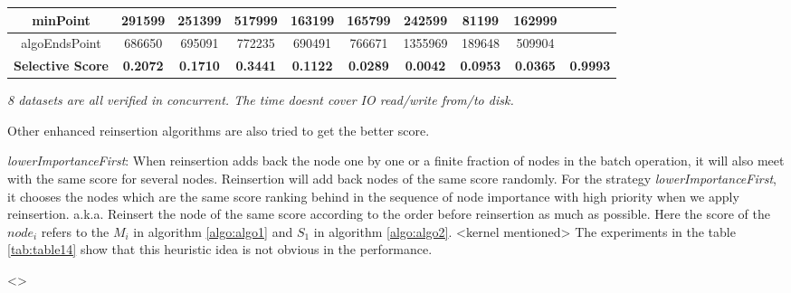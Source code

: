 \documentclass{article}
\begin{document}
\begin{table}[!htbp]
\begin{adjustwidth}{-2cm}{}
\begin{threeparttable}
\begin{tabular}{|c|c|c|c|c|c|c|c|c|c|}
				minPoint                         & 291599          & 251399          & 517999          & 163199          & 165799         & 242599         & 81199          & 162999         &                \\ \hline
				algoEndsPoint                    & 686650          & 695091          & 772235          & 690491          & 766671         & 1355969        & 189648         & 509904         &           \\ \hline \hline  
				\textbf{Selective Score}                 & \textbf{0.2072}          & \textbf{0.1710}          & \textbf{0.3441}          & \textbf{0.1122}          & \textbf{0.0289}         & \textbf{0.0042}         & \textbf{0.0953}         & \textbf{0.0365}         & \textbf{0.9993}   \\ \hline 				

			\end{tabular}
			\begin{tablenotes}
				\small
				\item\textit{ 8 datasets are all verified in concurrent. The time doesn\textquotesingle t cover IO read/write from/to disk.}
			\end{tablenotes}			
		\end{threeparttable}
	\end{adjustwidth}	
	\end{table}
	 
	 Other enhanced reinsertion algorithms are also tried to get the better score.
	 
	\begin{enumerate}
	\begin{item}
		\textit{lowerImportanceFirst}: When reinsertion adds back the node one by one or a finite fraction of nodes in the batch operation, it will also meet with the same score for several nodes. Reinsertion will add back nodes of the same score randomly. For the strategy \textit{lowerImportanceFirst}, it chooses the nodes which are the same score ranking behind in the sequence of node importance with high priority when we apply reinsertion. a.k.a. Reinsert the node of the same score according to the order before reinsertion as much as possible. Here the score of the $node_i$ refers to the $M_i$ in algorithm \ref{algo:algo1} and $S_1$ in algorithm \ref{algo:algo2}. <kernel mentioned> The experiments in the table \ref{tab:table14} show that this heuristic idea is not obvious in the performance.
		
		<{}>
	
	\end{item}
	\begin{item}

	\end{item}		
	\begin{item}

	\end{item}			
	
	\end{enumerate}			 
	 
\end{document}
